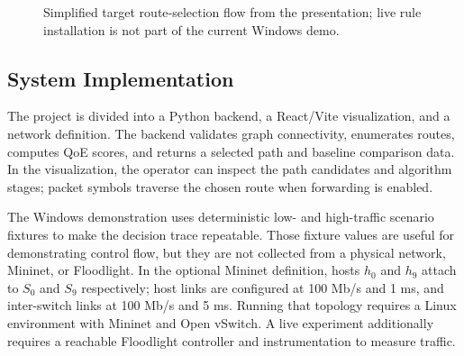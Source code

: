 \documentclass[conference]{IEEEtran}
\begin{document}
\begin{figure}[t]
\centering
{}
\caption{Simplified target route-selection flow from the presentation; live rule installation is not part of the current Windows demo.}
\label{fig:algorithm}
\end{figure}

\subsection{System Implementation}
The project is divided into a Python backend, a React/Vite visualization, and a network definition. The backend validates graph connectivity, enumerates routes, computes QoE scores, and returns a selected path and baseline comparison data. In the visualization, the operator can inspect the path candidates and algorithm stages; packet symbols traverse the chosen route when forwarding is enabled.

The Windows demonstration uses deterministic low- and high-traffic scenario fixtures to make the decision trace repeatable. Those fixture values are useful for demonstrating control flow, but they are not collected from a physical network, Mininet, or Floodlight. In the optional Mininet definition, hosts $h_0$ and $h_9$ attach to $S_0$ and $S_9$ respectively; host links are configured at 100 Mb/s and 1 ms, and inter-switch links at 100 Mb/s and 5 ms. Running that topology requires a Linux environment with Mininet and Open vSwitch. A live experiment additionally requires a reachable Floodlight controller and instrumentation to measure traffic.
\end{document}

